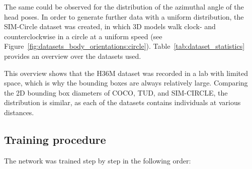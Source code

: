 \documentclass[a4paper, 10pt, conference]{ieeeconf}
\begin{document}
The same could be observed for the distribution of the azimuthal angle  of the head poses. In order to generate further data with a uniform distribution, the SIM-Circle dataset was created, in which 3D models walk clock- and counterclockwise in a circle at a uniform speed (see Figure~\ref{fig:datasets_body_orientations:circle}). Table~\ref{tab:dataset_statistics} provides an overview over the datasets used.

\begin{table}[!htbp]
  \centering
  \caption[Dataset - Statistics]{Statistics of datasets used in the PedRec experiments.  represents the 2D or 3D bounding box size and  the distance to the camera. The number of samples is notated as , the mean of bounding boxes and the distances to the camera as , and the standard deviation values are notated with .}
  \label{tab:dataset_statistics}
\end{table}

This overview shows that the H36M dataset was recorded in a lab with limited space, which is why the bounding boxes are always relatively large. Comparing the 2D bounding box diameters of COCO, TUD, and SIM-CIRCLE, the distribution is similar, as each of the datasets contains individuals at various distances.

\subsection{Training procedure}
\label{sec:pedrec:training}
The network was trained step by step in the following order:
\end{document}
